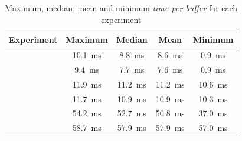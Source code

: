 \begin{table}[h]
    \centering
    \renewcommand{\arraystretch}{1.1}
    \begin{tabularx}{\textwidth}{|>{\raggedleft\arraybackslash}X||c|c|c|c|}
        \hline
        \textbf{Experiment} & \textbf{Maximum} & \textbf{Median} & \textbf{Mean} & \textbf{Minimum} \\
        \hline
        
        \nameref{evaluation/results/trace-no-delay} &
        \SI{10.1}{\milli\second} &
        \SI{8.8}{\milli\second} &
        \SI{8.6}{\milli\second} &
        \SI{0.9}{\milli\second}
        \\
        \hline

        \nameref{evaluation/results/trace-100us-delay} &
        \SI{9.4}{\milli\second} &
        \SI{7.7}{\milli\second} &
        \SI{7.6}{\milli\second} &
        \SI{0.9}{\milli\second}
        \\
        \hline

        \nameref{evaluation/results/synthetic-read-write-instructions-no-delay} &
        \SI{11.9}{\milli\second} &
        \SI{11.2}{\milli\second} &
        \SI{11.2}{\milli\second} &
        \SI{10.6}{\milli\second}
        \\
        \hline

        \nameref{evaluation/results/synthetic-read-write-instructions-100us-delay} &
        \SI{11.7}{\milli\second} &
        \SI{10.9}{\milli\second} &
        \SI{10.9}{\milli\second} &
        \SI{10.3}{\milli\second}
        \\
        \hline

        \nameref{evaluation/results/synthetic-ping-instructions-no-delay} &
        \SI{54.2}{\milli\second} &
        \SI{52.7}{\milli\second} &
        \SI{50.8}{\milli\second} &
        \SI{37.0}{\milli\second}
        \\
        \hline

        \nameref{evaluation/results/synthetic-ping-instructions-100us-delay} &
        \SI{58.7}{\milli\second} &
        \SI{57.9}{\milli\second} &
        \SI{57.9}{\milli\second} &
        \SI{57.0}{\milli\second}
        \\
        \hline
    \end{tabularx}
    \caption{Maximum, median, mean and minimum \textit{time per buffer} for each experiment}
\end{table}

